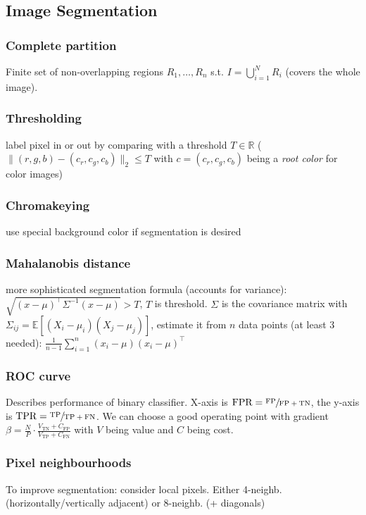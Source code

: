 \documentclass[a4paper,10pt]{article}
\begin{document}
\subsection{Image Segmentation}
\subsubsection{Complete partition} 
Finite set of non-overlapping regions \( R_1, \dots, R_n \) s.t. \( I = \bigcup_{i=1}^N R_i \) (covers the whole image). 

\subsubsection{Thresholding} 
label pixel in or out by comparing with a threshold \( T \in \mathbb{R} \) (\( \lVert (r,g,b) - (c_r,c_g,c_b) \rVert_2 \le T \) with \( c = (c_r,c_g,c_b) \) being a \textit{root color} for color images)

\subsubsection{Chromakeying}
use special background color if segmentation is desired 

\subsubsection{Mahalanobis distance} 
more sophisticated segmentation formula (accounts for variance): \( \sqrt{(x - \mu)^\top \Sigma^{-1}(x - \mu)} > T \), \( T \) is threshold. \( \Sigma  \) is the covariance matrix with \( \Sigma_{ij} = \mathbb{E}\left[(X_i - \mu_i)(X_j - \mu_j) \right] \), estimate it from \( n \) data points (at least 3 needed): \( \frac{1}{n-1} \sum_{i=1}^{n} (x_i - \mu)(x_i - \mu)^\top \)

\subsubsection{ROC curve} 
Describes performance of binary classifier. X-axis is \( \text{FPR} = \sfrac{\text{FP}}{\text{FP}+\text{TN}} \), the y-axis is \( \text{TPR} = \sfrac{\text{TP}}{\text{TP} + \text{FN}} \). We can choose a good operating point with gradient \( \beta = \frac{N}{P} \cdot \frac{V_\text{TN} + C_\text{FP}}{V_\text{TP} + C_\text{FN}} \) with \( V \) being value and \( C \) being cost.

\subsubsection{Pixel neighbourhoods}
To improve segmentation: consider local pixels. Either 4-neighb. (horizontally/vertically adjacent) or 8-neighb. (+ diagonals)
\end{document}
